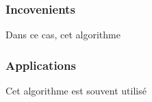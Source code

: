 \documentclass{article}
\begin{document}
\subsubsection{Incovenients}
Dans ce cas, cet algorithme 

\subsubsection{Applications}
Cet algorithme est souvent utilisé 





\end{document}
